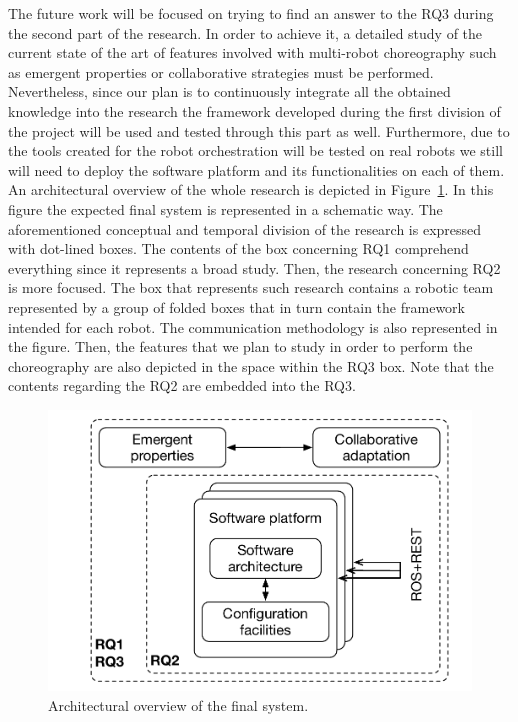 The future work will be focused on trying to find an answer to the RQ3 during the second part of the research.
In order to achieve it, a detailed study of the current state of the art of features involved with multi-robot choreography such as emergent properties or collaborative strategies must be performed.
Nevertheless, since our plan is to continuously integrate all the obtained knowledge into the research the framework developed during the first division of the project will be used and tested through this part as well.
Furthermore, due to the tools created for the robot orchestration will be tested on real robots we still will need to deploy the software platform and its functionalities on each of them.
An architectural overview of the whole research is depicted in Figure~\ref{fig:overview}.
In this figure the expected final system is represented in a schematic way.
The aforementioned conceptual and temporal division of the research is expressed with dot-lined boxes.
The contents of the box concerning RQ1 comprehend everything since it represents a broad study.
Then, the research concerning RQ2 is more focused.
The box that represents such research contains a robotic team represented by a group of folded boxes that in turn contain the framework intended for each robot.
The communication methodology is also represented in the figure.
Then, the features that we plan to study in order to perform the choreography are also depicted in the space within the RQ3 box.
Note that the contents regarding the RQ2 are embedded into the RQ3.


\begin{figure}[!t]
\begin{center}
\includegraphics[width=1\linewidth]{Figures/research.pdf}
\caption{Architectural overview of the final system.}
\label{fig:overview}
\end{center}
\end{figure}